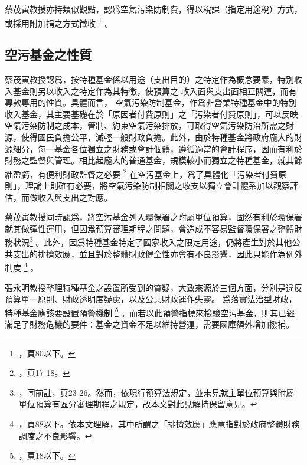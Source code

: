 \documentclass[12pt,a4paper]{article}
\begin{document}
蔡茂寅教授亦持類似觀點，認爲空氣污染防制費，得以稅課（指定用途稅）方式，或採用附加捐之方式徵收
\footnote{，頁80以下。}
。




\subsection{空污基金之性質}

蔡茂寅教授認爲，按特種基金係以用途（支出目的）之特定作為概念要素，特別收入基金則另以收入之特定作為其特徵，使預算之 收入面與支出面相互關連，而有專款專用的性質。具體而言，
空氣污染防制基金，作爲非營業特種基金中的特別收入基金，其主要基礎在於「原因者付費原則」之「污染者付費原則」，可以反映空氣污染防制之成本，管制、約束空氣污染排放，可取得空氣污染防治所需之財源，使得國民負擔公平，減輕一般財政負擔。此外，由於特種基金將政府龐大的財源細分，每一基金各位獨立之財務或會計個體，遵循適當的會計程序，因而有利於財務之監督與管理。相比起龐大的普通基金，規模較小而獨立之特種基金，就其餘絀盈虧，有便利財政監督之必要
\footnote{，頁17-18。}
在空污基金上，爲了具體化「污染者付費原則」，理論上則確有必要，將空氣污染防制相關之收支以獨立會計體系加以觀察評估，而做收入與支出之對應。

蔡茂寅教授同時認爲，將空污基金列入環保署之附屬單位預算，固然有利於環保署就其做彈性運用，但因爲預算審理期程之問題，會造成不容易監督環保署之整體財務狀況\footnote{
  ，同前註，頁23-26。然而，依現行預算法規定，並未見就主單位預算與附屬單位預算有區分審理期程之規定，故本文對此見解持保留意見。}
。此外，因爲特種基金特定了國家收入之限定用途，仍將產生對於其他公共支出的排擠效應，並且對於整體財政健全性亦會有不良影響，因此只能作為例外制度
\footnote{，頁88以下。依本文理解，其中所謂之「排擠效應」應意指對於政府整體財務調度之不良影響。}
。


張永明教授整理特種基金之設置所受到的質疑，大致來源於三個方面，分別是違反預算單一原則、財政透明度疑慮，以及公共財政運作失靈。
爲落實法治型財政，特種基金應該要設置預警機制
\footnote{，頁18以下。}
。而若以此預警指標來檢驗空污基金，則其已經滿足了財務危機的要件：基金之資金不足以維持營運，需要國庫額外增加撥補。
\end{document}
